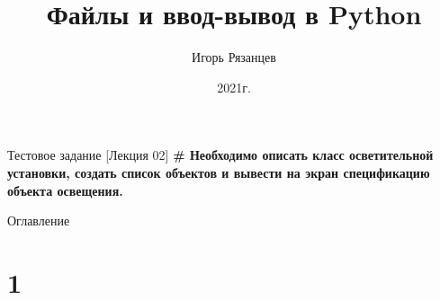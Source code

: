 \documentclass[12pt]{beamer}
\author{Игорь Рязанцев}
\title{Файлы и ввод-вывод в Python}
\institute{Лекция 03}
\date{2021г.}
\begin{document}
\begin{frame}
\titlepage
\end{frame}

\begin{frame}{Тестовое задание [Лекция 02]}
\textbf{\# Необходимо описать класс осветительной установки, создать список объектов и вывести на экран спецификацию объекта освещения.} \\
\end{frame}

\begin{frame}[t]{Оглавление}
\tableofcontents[part=1]
\end{frame}



\part{1}
\end{document}
